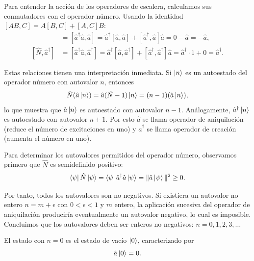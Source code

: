         Para entender la acción de los operadores de escalera, calculamos sus conmutadores con el operador número. Usando la identidad $[AB, C] = A[B, C] + [A, C]B$:
        \begin{align}
            [\hat{N}, \hat{a}] &= [\hat{a}^\dagger\hat{a}, \hat{a}] = \hat{a}^\dagger[\hat{a}, \hat{a}] + [\hat{a}^\dagger, \hat{a}]\hat{a} = 0 - \hat{a} = -\hat{a}, \\
            [\hat{N}, \hat{a}^\dagger] &= [\hat{a}^\dagger\hat{a}, \hat{a}^\dagger] = \hat{a}^\dagger[\hat{a}, \hat{a}^\dagger] + [\hat{a}^\dagger, \hat{a}^\dagger]\hat{a} = \hat{a}^\dagger \cdot 1 + 0 = \hat{a}^\dagger.
        \end{align}
        
        Estas relaciones tienen una interpretación inmediata. Si $\ket{n}$ es un autoestado del operador número con autovalor $n$, entonces
        \begin{equation}
            \hat{N}(\hat{a}\ket{n}) = \hat{a}(\hat{N} - 1)\ket{n} = (n-1)(\hat{a}\ket{n}),
        \end{equation}
        lo que muestra que $\hat{a}\ket{n}$ es autoestado con autovalor $n-1$. Análogamente, $\hat{a}^\dagger\ket{n}$ es autoestado con autovalor $n+1$. Por esto $\hat{a}$ se llama operador de aniquilación (reduce el número de excitaciones en uno) y $\hat{a}^\dagger$ se llama operador de creación (aumenta el número en uno).

        Para determinar los autovalores permitidos del operador número, observamos primero que $\hat{N}$ es semidefinido positivo:
        \begin{equation}
            \bra{\psi}\hat{N}\ket{\psi} = \bra{\psi}\hat{a}^\dagger\hat{a}\ket{\psi} = \|\hat{a}\ket{\psi}\|^2 \geq 0.
        \end{equation}
        
        Por tanto, todos los autovalores son no negativos. Si existiera un autovalor no entero $n = m + \epsilon$ con $0 < \epsilon < 1$ y $m$ entero, la aplicación sucesiva del operador de aniquilación produciría eventualmente un autovalor negativo, lo cual es imposible. Concluimos que los autovalores deben ser enteros no negativos: $n = 0, 1, 2, 3, \ldots$
        
        El estado con $n = 0$ es el estado de vacío $\ket{0}$, caracterizado por
        \begin{equation}
            \hat{a}\ket{0} = 0.
        \end{equation}
        
